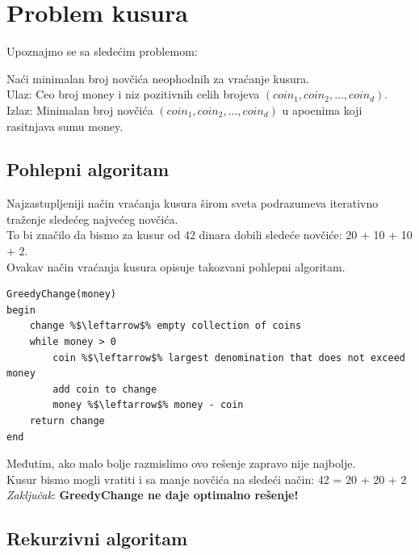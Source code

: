 \section{Problem kusura}

\noindent Upoznajmo se sa sledećim problemom:\\

\begin{problem}
	Naći minimalan broj novčića neophodnih za vraćanje kusura. \\
	Ulaz: Ceo broj money i niz pozitivnih celih brojeva $(coin_1, coin_2, ..., coin_d)$. \\
	Izlaz: Minimalan broj novčića $(coin_1, coin_2, ..., coin_d)$ u apoenima koji rasitnjava sumu money. \\
\end{problem}

\subsection{Pohlepni algoritam}

Najzastupljeniji način vraćanja kusura širom sveta podrazumeva iterativno traženje sledećeg najvećeg novčića.\\
To bi značilo da bismo za kusur od 42 dinara dobili sledeće novčiće: 20 + 10 + 10 + 2. \\
Ovakav način vraćanja kusura opisuje takozvani pohlepni algoritam. \\

\begin{lstlisting}
GreedyChange(money)
begin
    change %$\leftarrow$% empty collection of coins
	while money > 0
		coin %$\leftarrow$% largest denomination that does not exceed money
		add coin to change
		money %$\leftarrow$% money - coin
	return change
end
\end{lstlisting}

Međutim, ako malo bolje razmislimo ovo rešenje zapravo nije najbolje.\\
Kusur bismo mogli vratiti i sa manje novčića na sledeći način: 42 = 20 + 20 + 2 \\

\textit{Zaključak}: \textbf{GreedyChange ne daje optimalno rešenje!}

\subsection{Rekurzivni algoritam}

